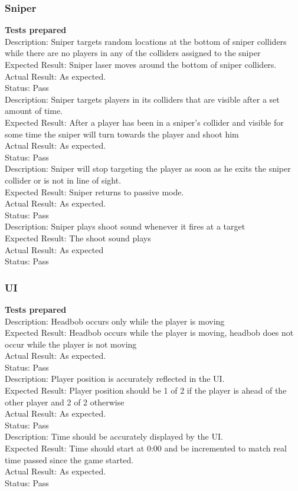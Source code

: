 \documentclass[11pt,a4paper]{article}
\begin{document}
\subsubsection{Sniper}
\textbf{Tests prepared}\\
Description: Sniper targets random locations at the bottom of sniper colliders while there are no players in any of the colliders assigned to the sniper\\
Expected Result: Sniper laser moves around the bottom of sniper colliders.\\
Actual Result: As expected.\\
Status: Pass
\smallskip\\
Description: Sniper targets players in its colliders that are visible after a set amount of time.\\
Expected Result: After a player has been in a sniper's collider and visible for some time the sniper will turn towards the player and shoot him\\
Actual Result: As expected.\\
Status: Pass
\smallskip\\
Description: Sniper will stop targeting the player as soon as he exits the sniper collider or is not in line of sight.\\
Expected Result: Sniper returns to passive mode.\\
Actual Result: As expected.\\
Status: Pass
\smallskip\\
Description: Sniper plays shoot sound whenever it fires at a target\\
Expected Result: The shoot sound plays\\
Actual Result:  As expected\\
Status: Pass
\subsubsection{UI}
\textbf{Tests prepared}\\
Description: Headbob occurs only while the player is moving\\
Expected Result: Headbob occurs while the player is moving, headbob does not occur while the player is not moving\\
Actual Result: As expected.\\
Status: Pass
\smallskip\\
Description: Player position is accurately reflected in the UI.\\
Expected Result: Player position should be 1 of 2 if the player is ahead of the other player and 2 of 2 otherwise\\
Actual Result: As expected.\\
Status: Pass
\smallskip\\
Description: Time should be accurately displayed by the UI.\\
Expected Result: Time should start at 0:00 and be incremented to match real time passed since the game started.\\
Actual Result: As expected.\\
Status: Pass
\end{document}
